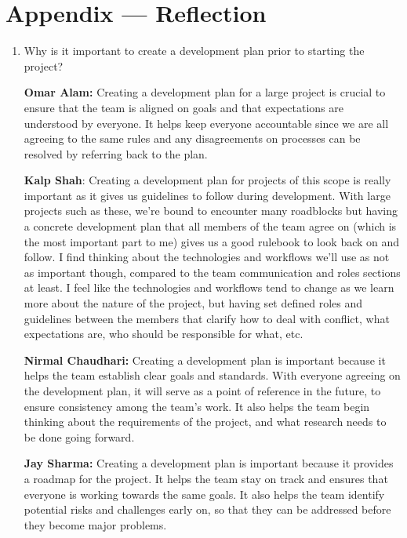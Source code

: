 \documentclass{article}
\begin{document}
\newpage{}

\section*{Appendix --- Reflection}

\begin{enumerate}
    \item Why is it important to create a development plan prior to starting the
    project?

    \textbf{Omar Alam:} Creating a development plan for a large project is
    crucial to ensure that the team is aligned on goals and that expectations
    are understood by everyone. It helps keep everyone accountable since we are
    all agreeing to the same rules and any disagreements on processes can be
    resolved by referring back to the plan.

    \textbf{Kalp Shah}: Creating a development plan for projects of this scope
    is really important as it gives us guidelines to follow during development.
    With large projects such as these, we're bound to encounter many roadblocks
    but having a concrete development plan that all members of the team agree on
    (which is the most important part to me) gives us a good rulebook to look
    back on and follow. I find thinking about the technologies and workflows
    we'll use as not as important though, compared to the team communication and
    roles sections at least. I feel like the technologies and workflows tend to
    change as we learn more about the nature of the project, but having set
    defined roles and guidelines between the members that clarify how to deal
    with conflict, what expectations are, who should be responsible for what,
    etc. 
    
    \textbf{Nirmal Chaudhari:} Creating a development plan is important because
    it helps the team establish clear goals and standards. With everyone
    agreeing on the development plan, it will serve as a point of reference in
    the future, to ensure consistency among the team's work. It also helps the
    team begin thinking about the requirements of the project, and what research
    needs to be done going forward. 

    \textbf{Jay Sharma:} Creating a development plan is important because it
    provides a roadmap for the project. It helps the team stay on track and
    ensures that everyone is working towards the same goals. It also helps the
    team identify potential risks and challenges early on, so that they can be
    addressed before they become major problems.


\end{enumerate}
\end{document}
